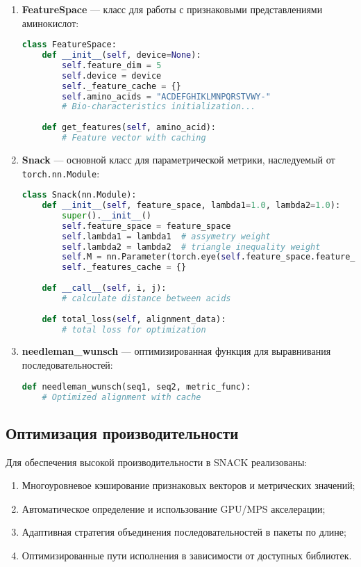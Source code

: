 \documentclass[12pt]{article}
\begin{document}
\begin{enumerate}
\item \textbf{FeatureSpace} — класс для работы с признаковыми представлениями аминокислот:
\begin{lstlisting}[language=Python]
class FeatureSpace:
    def __init__(self, device=None):
        self.feature_dim = 5
        self.device = device
        self._feature_cache = {}
        self.amino_acids = "ACDEFGHIKLMNPQRSTVWY-"
        # Bio-characteristics initialization...
        
    def get_features(self, amino_acid):
        # Feature vector with caching
\end{lstlisting}

\item \textbf{Snack} — основной класс для параметрической метрики, наследуемый от \texttt{torch.nn.Module}:
\begin{lstlisting}[language=Python]
class Snack(nn.Module):
    def __init__(self, feature_space, lambda1=1.0, lambda2=1.0):
        super().__init__()
        self.feature_space = feature_space
        self.lambda1 = lambda1  # assymetry weight
        self.lambda2 = lambda2  # triangle inequality weight
        self.M = nn.Parameter(torch.eye(self.feature_space.feature_dim))
        self._features_cache = {}
        
    def __call__(self, i, j):
        # calculate distance between acids
        
    def total_loss(self, alignment_data):
        # total loss for optimization
\end{lstlisting}

\item \textbf{needleman\_wunsch} — оптимизированная функция для выравнивания последовательностей:
\begin{lstlisting}[language=Python]
def needleman_wunsch(seq1, seq2, metric_func):
    # Optimized alignment with cache
\end{lstlisting}
\end{enumerate}

\subsection{Оптимизация производительности}

Для обеспечения высокой производительности в SNACK реализованы:

\begin{enumerate}
\item Многоуровневое кэширование признаковых векторов и метрических значений;
\item Автоматическое определение и использование GPU/MPS акселерации;
\item Адаптивная стратегия объединения последовательностей в пакеты по длине;
\item Оптимизированные пути исполнения в зависимости от доступных библиотек.
\end{enumerate}
\end{document}
